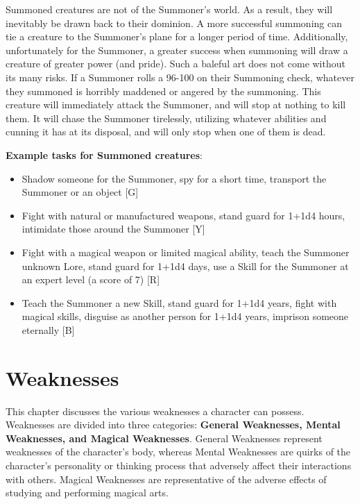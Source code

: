 \documentclass[oneside]{book}
\begin{document}
\begin{multicols}{2}
Summoned creatures are not of the Summoner's world. As a result, they will inevitably be drawn back to their dominion. A more successful summoning can tie a creature to the Summoner's plane for a longer period of time. Additionally, unfortunately for the Summoner, a greater success when summoning will draw a creature of greater power (and pride). Such a baleful art does not come without its many risks. If a Summoner rolls a 96-100 on their Summoning check, whatever they summoned is horribly maddened or angered by the summoning. This creature will immediately attack the Summoner, and will stop at nothing to kill them. It will chase the Summoner tirelessly, utilizing whatever abilities and cunning it has at its disposal, and will only stop when one of them is dead.

\textbf{Example tasks for Summoned creatures}: 
	\begin{itemize}
		\setlength{\itemsep}{0cm}%
  		\setlength{\parskip}{0cm}%
		\item{ \small Shadow someone for the Summoner, spy for a short time, transport the Summoner or an object [G]}
		\item{ \small Fight with natural or manufactured weapons, stand guard for 1+1d4 hours, intimidate those around the Summoner  [Y]}
		\item{ \small Fight with a magical weapon or limited magical ability, teach the Summoner unknown Lore, stand guard for 1+1d4 days, use a Skill for the Summoner at an expert level (a score of 7) [R]}
		\item{ \small Teach the Summoner a new Skill, stand guard for 1+1d4 years, fight with magical skills, disguise as another person for 1+1d4 years, imprison someone eternally  [B]}
	\end{itemize}
	
\end{multicols}

\chapter{Weaknesses}

This chapter discusses the various weaknesses a character can possess. Weaknesses are divided into three categories: \textbf{General Weaknesses, Mental Weaknesses, and Magical Weaknesses}. General Weaknesses represent weaknesses of the character's body, whereas Mental Weaknesses are quirks of the character's personality or thinking process that adversely affect their interactions with others. Magical Weaknesses are representative of the adverse effects of studying and performing magical arts.
\end{document}
